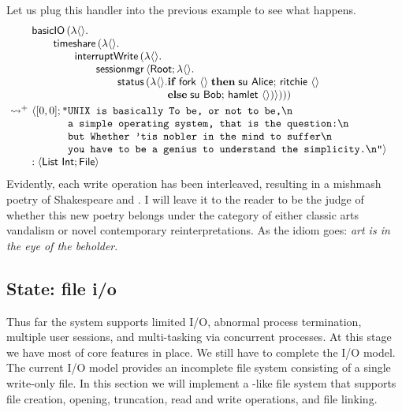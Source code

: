 \documentclass[12pt,phd,lfcs,twoside,openright,logo,leftchapter,normalheadings]{infthesis}
\theoremstyle{plain}
\theoremstyle{definition}
\begin{document}
Let us plug this handler into the previous example to see what
happens.
%
\[
  \ba{@{~}l@{~}l}
    &\bl
    \basicIO\,(\lambda\Unit.\\
         \qquad\timeshare\,(\lambda\Unit.\\
         \qquad\qquad\dec{interruptWrite}\,(\lambda\Unit.\\
         \qquad\qquad\qquad\sessionmgr\,\Record{\Root;\lambda\Unit.\\
         \qquad\qquad\qquad\qquad\status\,(\lambda\Unit.
                 \ba[t]{@{}l}
                   \If\;\fork~\Unit\;\Then\;
                       \su~\Alice;\,
                       \quoteRitchie~\Unit\\
                   \Else\;
                       \su~\Bob;\,
                       \quoteHamlet~\Unit)})))
                 \ea
     \el \smallskip\\
     \reducesto^+&
     \bl
      \Record{
       \ba[t]{@{}l}
         [0, 0];
         \texttt{"}\ba[t]{@{}l}
         \texttt{UNIX is basically To be, or not to be,\nl{}}\\
         \texttt{a simple operating system, that is the question:\nl{}}\\
         \texttt{but Whether 'tis nobler in the mind to suffer\nl{}}\\
         \texttt{you have to be a genius to understand the simplicity.\nl{}"}}
         \ea
       \ea\\
       : \Record{\List~\Int; \UFile}
     \el
  \ea
\]
%
Evidently, each write operation has been interleaved, resulting in a
mishmash poetry of Shakespeare and \UNIX{}.
%
I will leave it to the reader to be the judge of whether this new
poetry belongs under the category of either classic arts vandalism or
novel contemporary reinterpretations.  As the idiom goes: \emph{art is
  in the eye of the beholder}.

\subsection{State: file i/o}
\label{sec:tiny-unix-io}

Thus far the system supports limited I/O, abnormal process
termination, multiple user sessions, and multi-tasking via concurrent
processes. At this stage we have most of core features in place. We
still have to complete the I/O model. The current I/O model provides
an incomplete file system consisting of a single write-only file.
%
In this section we will implement a \UNIX{}-like file system that
supports file creation, opening, truncation, read and write
operations, and file linking.
%
\end{document}
